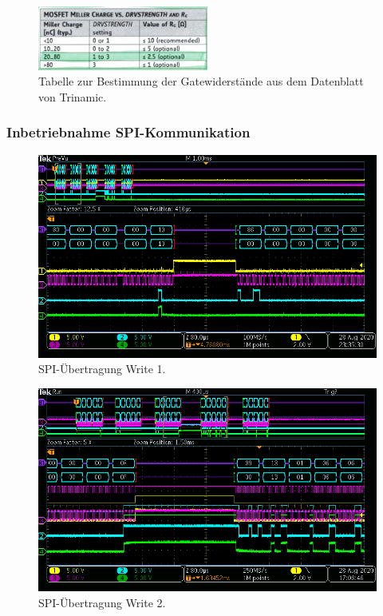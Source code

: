 \begin{figure}[H]
	\centering
	\includegraphics[width=0.5\textwidth]{graphics/Tabelle_Gatewiderstaende.png}
	\caption{Tabelle zur Bestimmung der Gatewiderstände aus dem Datenblatt von Trinamic.\cite[S.13]{trinamicmotion_control_gmbh__co_kg_tmc6200_2019}}
	\label{fig:Tabelle_Gatewiderstaende}
\end{figure}

\subsubsection{Inbetriebnahme SPI-Kommunikation}\label{Appendix:TMC6200_SPI}

\begin{figure}[H]
\center
\includegraphics[width = \textwidth]{graphics/TMC6200_Beschreiben2}
\caption{SPI-Übertragung Write 1.}
\label{fig:TMC6200_Beschreiben2}
\end{figure}

\begin{figure}[H]
\center
\includegraphics[width = \textwidth]{graphics/TMC6200_Beschreiben}
\caption{SPI-Übertragung Write 2.}
\label{fig:TMC6200_Beschreiben}
\end{figure}


